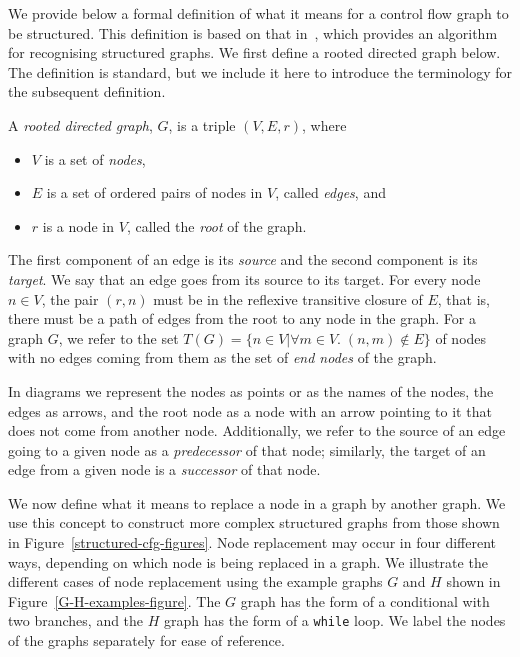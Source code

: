 We provide below a formal definition of what it means for a control
flow graph to be structured. 
This definition is based on that in~\cite{bento2017}, which provides
an algorithm for recognising structured graphs.
We first define a rooted directed graph below. 
The definition is standard, but we include it here to introduce the
terminology for the subsequent definition.
\begin{defn} A \emph{rooted directed graph},
$G$, is a triple $(V,E,r)$, where
  \begin{itemize}
  \item $V$ is a set of \emph{nodes},
  \item $E$ is a set of ordered pairs of nodes in $V$, called
\emph{edges}, and
  \item $r$ is a node in $V$, called the \emph{root} of the graph.
  \end{itemize}
  The first component of an edge is its \emph{source}
  and the second component is its \emph{target}. 
  We say that an edge goes from its source to its target. 
  For every node $n \in V$, the pair $(r,n)$ must be in the reflexive
  transitive closure of $E$, that is, there must be a path of edges
  from the root to any node in the graph.
  For a graph $G$, we refer to the set
  $T(G) = \{ n \in V | \forall m \in V.\; (n,m) \notin E\}$ of nodes
  with no edges coming from them as the set of \emph{end nodes} of the
  graph.
\end{defn}
In diagrams we represent the nodes as points or as the names of the
nodes, the edges as arrows, and the root node as a node with an arrow
pointing to it that does not come from another node.
Additionally, we refer to the source of an edge going to a given node
as a \emph{predecessor} of that node; similarly, the target of an edge
from a given node is a \emph{successor} of that node.

We now define what it means to replace a node in a graph by another
graph.
We use this concept to construct more complex structured graphs from
those shown in Figure~\ref{structured-cfg-figures}.
Node replacement may occur in four different ways, depending on which
node is being replaced in a graph.
We illustrate the different cases of node replacement using the
example graphs $G$ and $H$ shown in Figure~\ref{G-H-examples-figure}.
The $G$ graph has the form of a conditional with two branches, and the
$H$ graph has the form of a \texttt{while} loop.
We label the nodes of the graphs separately for ease of reference.

